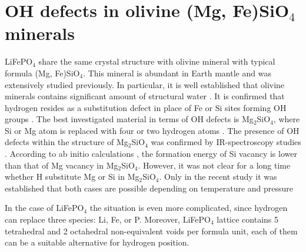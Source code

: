 \section{OH defects in olivine (Mg, Fe)SiO$_4$ minerals}
LiFePO$_4$ share the same crystal structure with olivine mineral with typical formula (Mg, Fe)SiO$_4$. This mineral is abundant in Earth mantle and was extensively studied previously. In particular, it is well established that olivine minerals contains significant amount of structural water . 
It is confirmed that hydrogen resides as a substitution defect in place of Fe or Si sites forming OH groups . 
The best investigated material in terms of OH defects is Mg$_2$SiO$_4$, where Si or Mg atom is replaced with four or two hydrogen atoms \cite{wright1994computer}. 
The presence of OH defects within the structure of Mg$_2$SiO$_4$ was confirmed by IR-spectroscopy studies \cite{rossman1996studies}. 
According to ab initio calculations \cite{brodholt2000ab}, the formation energy of Si vacancy is lower than that of Mg vacancy in Mg$_2$SiO$_4$. 
However, it was not clear for a long time whether H substitute Mg or Si in Mg$_2$SiO$_4$. Only in the recent study it was established that both cases are possible depending on temperature and pressure~\cite{qin2018ab}

In the case of LiFePO$_4$ the situation is even more complicated, since hydrogen can replace three species: Li, Fe, or P. Moreover, LiFePO$_4$ lattice contains 5 tetrahedral and 2 octahedral non-equivalent voids per formula unit, each of them can be a suitable alternative for hydrogen position. 

